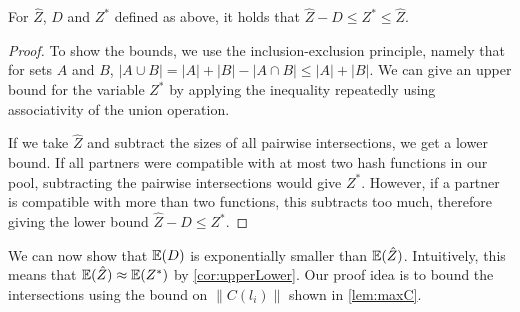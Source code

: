 \documentclass[a4paper,USenglish,cleveref]{lipics-v2021}
\begin{document}
\begin{observation}
  For $\hat Z$, $D$ and $Z^*$ defined as above, it holds that $\hat Z-D \leq Z^* \leq \hat Z$.
  \label{cor:upperLower}
\end{observation}
\begin{proof}
  To show the bounds, we use the inclusion-exclusion principle, namely that for sets $A$ and $B$, $|A \cup B| = |A|+|B| - |A \cap B| \leq |A|+|B|$.
  We can give an upper bound for the variable $Z^*$ by applying the inequality repeatedly using associativity of the union operation.

  If we take $\hat Z$ and subtract the sizes of all pairwise intersections, we get a lower bound.
  If all partners were compatible with at most two hash functions in our pool, subtracting the pairwise intersections would give $Z^*$.
  However, if a partner is compatible with more than two functions, this subtracts too much, therefore giving the lower bound $\hat Z-D \leq Z^*$.
\end{proof}

We can now show that $\mathbb{E}(D)$ is exponentially smaller than $\mathbb{E}(\hat Z)$.
Intuitively, this means that $\mathbb{E}(\hat Z) \approx \mathbb{E}(Z^*)$ by \cref{cor:upperLower}.
Our proof idea is to bound the intersections using the bound on $\|C(l_i)\|$ shown in \cref{lem:maxC}.
\end{document}
